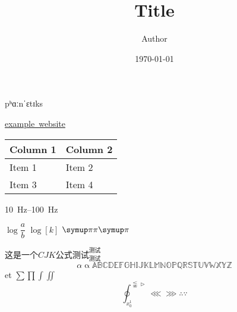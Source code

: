 \documentclass[twoside]{article}
\title{Title}
\author{Author}
\date{\today}
\begin{document}
    \maketitle
    {\gentium pʰɑːnˈɛtɪks}
    
    \href{www.example.com}{example\ website}

    \begin{tabu} to 1\textwidth {X[2,l]X[1,r]}
        Column 1 & Column 2 \\
        \hline
        Item 1 & Item 2 \\
        Item 3 & Item 4 \\
    \end{tabu}

    \SIrange{10}{100}{\hertz}

    $\log{\dfrac{a}{b}}$
    $\log[k]{}$
    \log{}
    $\circratio\pi\ppi$
    \HH

    $这是一个CJK公式测试^{测试}_{测试}$
    $$\alpha \upalpha \mathbb{A} \mathbb{B} \mathbb{C} \mathbb{D} \mathbb{E} \mathbb{F} \mathbb{G} \mathbb{H} \mathbb{I} \mathbb{J} \mathbb{K}%
     \mathbb{L} \mathbb{M} \mathbb{N} \mathbb{O} \mathbb{P} \mathbb{Q} \mathbb{R} \mathbb{S} \mathbb{T} \mathbb{U} \mathbb{V} \mathbb{W} \mathbb{X}%
     \mathbb{Y} \mathbb{Z} $$
     et 
    \(\sum \prod \int \iint \)
    \[\oint_{x_0^1}^{\lnapprox \vartriangleright}\lll \ggg \therefore \because  \]
\end{document}
